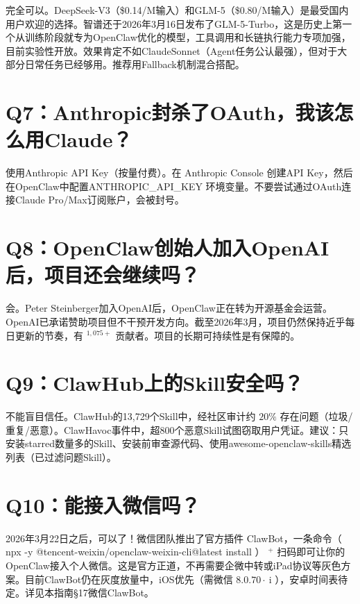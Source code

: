 \documentclass[
  10
]{article}
\begin{document}
完全可以。DeepSeek-V3（\$0.14/M输入）和GLM-5（\$0.80/M输入）是最受国内用户欢迎的选择。智谱还于2026年3月16日发布了GLM-5-Turbo，这是历史上第一个从训练阶段就专为OpenClaw优化的模型，工具调用和长链执行能力专项加强，目前实验性开放。效果肯定不如ClaudeSonnet（Agent任务公认最强），但对于大部分日常任务已经够用。推荐用Fallback机制混合搭配。

\section{Q7：Anthropic封杀了OAuth，我该怎么用Claude？}\label{q7anthropicux5c01ux6740ux4e86oauthux6211ux8be5ux600eux4e48ux7528claude}

使用Anthropic API Key（按量付费）。在 Anthropic Console 创建API
Key，然后在OpenClaw中配置ANTHROPIC\_API\_KEY
环境变量。不要尝试通过OAuth连接Claude Pro/Max订阅账户，会被封号。

\section{Q8：OpenClaw创始人加入OpenAI后，项目还会继续吗？}\label{q8openclawux521bux59cbux4ebaux52a0ux5165openaiux540eux9879ux76eeux8fd8ux4f1aux7ee7ux7eedux5417}

会。Peter
Steinberger加入OpenAI后，OpenClaw正在转为开源基金会运营。OpenAI已承诺赞助项目但不干预开发方向。截至2026年3月，项目仍然保持近乎每日更新的节奏，有
\(^ { 1 , 0 7 5 + }\) 贡献者。项目的长期可持续性是有保障的。

\section{Q9：ClawHub上的Skill安全吗？}\label{q9clawhubux4e0aux7684skillux5b89ux5168ux5417}

不能盲目信任。ClawHub的13,729个Skill中，经社区审计约 \(2 0 \%\)
存在问题（垃圾/重复/恶意）。ClawHavoc事件中，超800个恶意Skill试图窃取用户凭证。建议：只安装starred数量多的Skill、安装前审查源代码、使用awesome-openclaw-skills精选列表（已过滤问题Skill）。

\section{Q10：能接入微信吗？}\label{q10ux80fdux63a5ux5165ux5faeux4fe1ux5417}

2026年3月22日之后，可以了！微信团队推出了官方插件 ClawBot，一条命令（
npx -y @tencent-weixin/openclaw-weixin-cli@latest install ） \(^ +\)
扫码即可让你的OpenClaw接入个人微信。这是官方正道，不再需要企微中转或iPad协议等灰色方案。目前ClawBot仍在灰度放量中，iOS优先（需微信
\(8 . 0 . 7 0 \cdot \mathrm { \ i }\)
），安卓时间表待定。详见本指南§17微信ClawBot。
\end{document}
